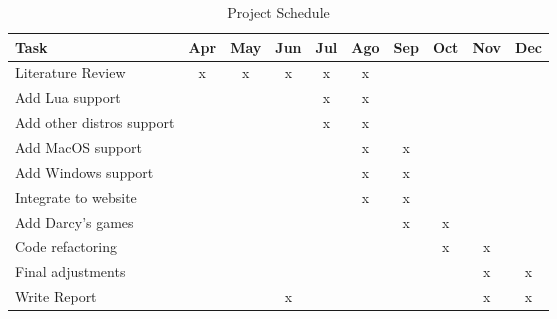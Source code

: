 \begin{table}[h!]
\centering
\caption{Project Schedule}
\label{tab:schedule}
\begin{tabular}{|l|c|c|c|c|c|c|c|c|c|}
\hline
\textbf{Task} & \multicolumn{1}{l|}{\textbf{Apr}} & \multicolumn{1}{l|}{\textbf{May}} & \multicolumn{1}{l|}{\textbf{Jun}} & \multicolumn{1}{l|}{\textbf{Jul}} & \multicolumn{1}{l|}{\textbf{Ago}} & \multicolumn{1}{l|}{\textbf{Sep}} & \multicolumn{1}{l|}{\textbf{Oct}} & \multicolumn{1}{l|}{\textbf{Nov}} & \multicolumn{1}{l|}{\textbf{Dec}} \\ \hline
Literature Review & x & x & x & x & x &  &  &  &  \\ \hline
Add Lua support &  &  &  & x & x &  &  &  &  \\ \hline
Add other distros support &  &  &  & x & x &  &  &  &  \\ \hline
Add MacOS support &  &  &  &  & x & x &  &  &  \\ \hline
Add Windows support &  &  &  &  & x & x &  &  &  \\ \hline
Integrate to website &  &  &  &  & x & x &  &  &  \\ \hline
Add Darcy's games &  &  &  &  &  & x & x &  &  \\ \hline
Code refactoring &  &  &  &  &  &  & x & x &  \\ \hline
Final adjustments &  &  &  &  &  &  &  & x & x \\ \hline
Write Report &  &  & x &  &  &  &  & x & x \\ \hline
\end{tabular}
\end{table}